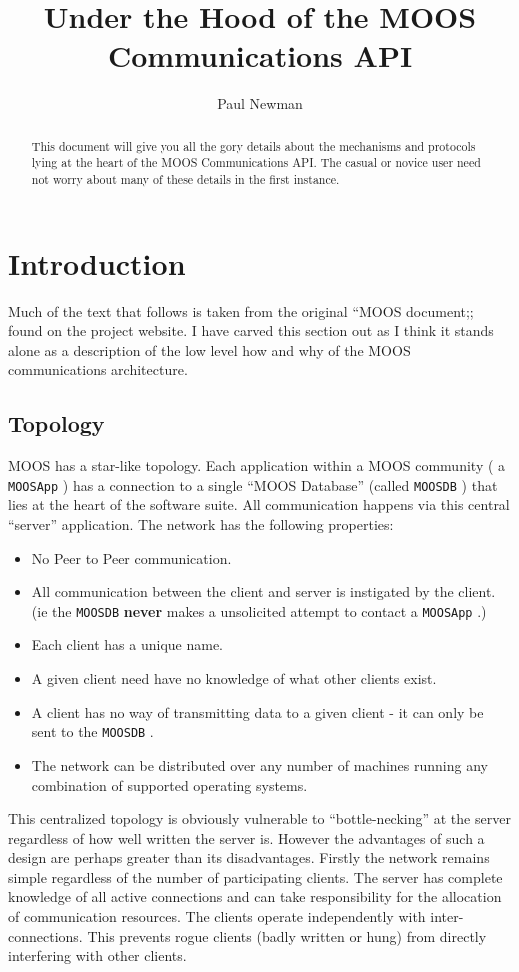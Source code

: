 \documentclass[a4paper,10pt]{article}
\title{Under the Hood of the MOOS Communications API}
\author{Paul Newman}
\newcommand{\Code}[1]{\texttt{#1} }
\newcommand{\code}[1]{\Code{#1} }
\newcommand{\DB}   {\code{{MOOSDB}}}
\newcommand{\MA}   {\code{{MOOSApp}}}
\begin{document}
\maketitle

\begin{center}
\end{center}
\begin{abstract}
This document will  give you all the gory details about the mechanisms and protocols
lying at the heart of the MOOS Communications API. The casual or novice user need not worry about many of these details
in the first instance.
\end{abstract}


\section{Introduction}

Much of the text that follows is taken from the original ``MOOS document;;
found on the project website. I have carved this section out as I think it stands alone
as a description of the low level how and why of the MOOS communications architecture.


\subsection{Topology}\label{Sec:Topology}
MOOS has a star-like topology. Each application within a MOOS
community ( a \MA) has a connection to a single ``MOOS Database''
(called \DB) that lies at the heart of the software suite. All
communication happens via this central ``server'' application. The
network has the following properties:
\begin{itemize}
\item No Peer to Peer communication.
\item All communication  between the client and server is instigated by the
client. (ie the \DB {\textbf{never}} makes a unsolicited attempt
to contact a \MA.)
\item Each client has a unique name.
\item A given client need have no knowledge of what other clients exist.
\item A client has no way of transmitting data to a given client -
it can only be sent to  the \DB.
\item The network can be distributed over any number of machines
running any combination of supported operating systems.
\end{itemize}
This centralized topology is obviously vulnerable to
``bottle-necking'' at the server regardless of how well written
the server is. However the advantages of such a design are perhaps
greater than its disadvantages. Firstly the network remains simple
regardless of the number of participating clients. The server has
complete knowledge of all active connections and can take
responsibility for the allocation of communication resources. The
clients operate independently  with inter-connections. This
prevents rogue clients (badly written or hung) from directly
interfering with other clients.
\end{document}
